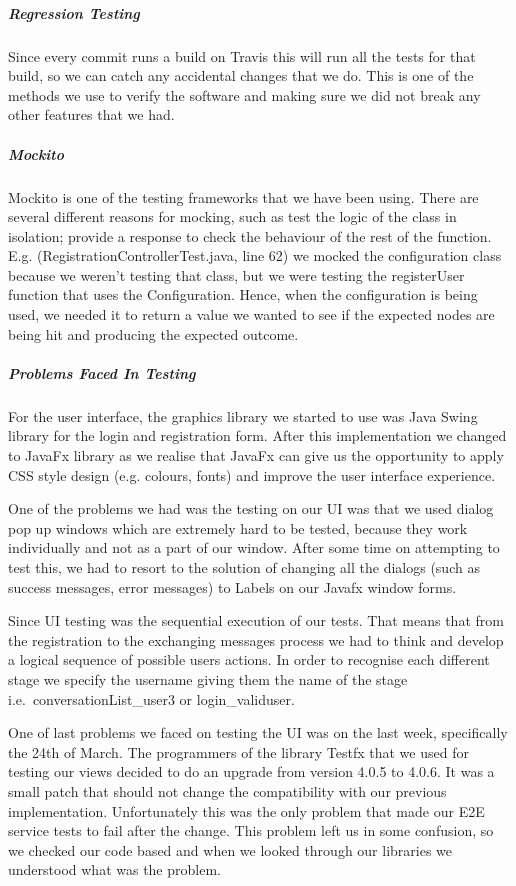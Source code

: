 \documentclass[11pt,a4paper]{report}
\begin{document}
\subparagraph{Regression Testing} Since every commit runs a build on Travis this will run all the tests for that build, so we can catch any accidental changes that we do. This is one of the methods we use to verify the software and making sure we did not break any other features that we had. 

\subparagraph{Mockito}
Mockito is one of the testing frameworks that we have been using. There are several different reasons for mocking, such as test the logic of the class in isolation; provide a response to check the behaviour of the rest of the function. E.g. (RegistrationControllerTest.java, line 62) we mocked the configuration class because we weren’t testing that class, but we were testing the registerUser function that uses the Configuration. Hence, when the configuration is being used, we needed it to return a value we wanted to see if the expected nodes are being hit and producing the expected outcome.

\subparagraph{Problems Faced In Testing} 
For the user interface, the graphics library we started to use was Java Swing library for the login and registration form. After this implementation we changed to JavaFx library as we realise that JavaFx can give us the opportunity to apply CSS style design (e.g. colours, fonts) and improve the user interface experience. 

One of the problems we had was the testing on our UI was that we used dialog pop up windows which are extremely hard to be tested, because they work individually and not as a part of our window. After some time on attempting to test this, we had to resort to the solution of changing all the dialogs (such as success messages, error messages) to Labels on our Javafx window forms. 

Since UI testing was the sequential execution of our tests. That means that from the registration to the exchanging messages process we had to think and develop a logical sequence of possible users actions. In order to recognise each different stage we specify the username giving them the name of the stage i.e.\ conversationList\_user3 or login\_validuser. 

One of last problems we faced on testing the UI was on the last week, specifically the 24th of March. The programmers of the library Testfx that we used for testing our views decided to do an upgrade from version 4.0.5 to 4.0.6. It was a small patch that should not change the compatibility with our previous implementation. Unfortunately this was the only problem that made our E2E service tests to fail after the change. This problem left us in some confusion, so we checked our code based and when we looked through our libraries we understood what was the problem.  
\end{document}

